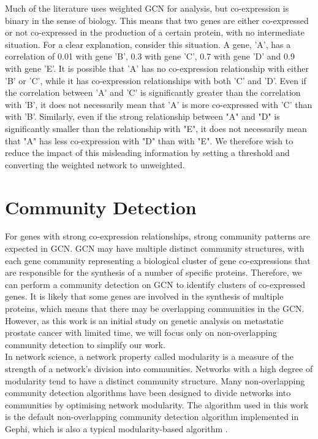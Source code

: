 \documentclass[12pt,a4paper]{report}
\begin{document}
Much of the literature uses weighted GCN for analysis, but co-expression is binary in the sense of biology. This means that two genes are either co-expressed or not co-expressed in the production of a certain protein, with no intermediate situation. For a clear explanation, consider this situation. A gene, 'A', has a correlation of 0.01 with gene 'B', 0.3 with gene 'C', 0.7 with gene 'D' and 0.9 with gene 'E'. It is possible that 'A' has no co-expression relationship with either 'B' or 'C', while it has co-expression relationships with both 'C' and 'D'. Even if the correlation between 'A' and 'C' is significantly greater than the correlation with 'B', it does not necessarily mean that 'A' is more co-expressed with 'C' than with 'B'. Similarly, even if the strong relationship between "A" and "D" is significantly smaller than the relationship with "E", it does not necessarily mean that "A" has less co-expression with "D" than with "E". We therefore wish to reduce the impact of this misleading information by setting a threshold and converting the weighted network to unweighted.

\section{Community Detection}
For genes with strong co-expression relationships, strong community patterns are expected in GCN. GCN may have multiple distinct community structures, with each gene community representing a biological cluster of gene co-expressions that are responsible for the synthesis of a number of specific proteins. Therefore, we can perform a community detection on GCN to identify clusters of co-expressed genes. It is likely that some genes are involved in the synthesis of multiple proteins, which means that there may be overlapping communities in the GCN. However, as this work is an initial study on genetic analysis on metastatic prostate cancer with limited time, we will focus only on non-overlapping community detection to simplify our work.\\

In network science, a network property called modularity is a measure of the strength of a network's division into communities.  Networks with a high degree of modularity tend to have a distinct community structure. Many non-overlapping community detection algorithms have been designed to divide networks into communities by optimising network modularity. The algorithm used in this work is the default non-overlapping community detection algorithm implemented in Gephi, which is also a typical modularity-based algorithm \cite{Vin08}.\\
\end{document}
